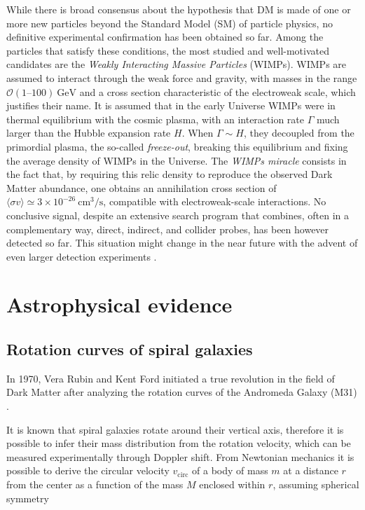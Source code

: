 While there is broad consensus about the hypothesis that DM is made of one or more new particles beyond the Standard Model (SM) of particle physics, 
no definitive experimental confirmation has been obtained so far. Among the particles that satisfy these conditions, the most studied and well-motivated candidates are the \emph{Weakly Interacting Massive Particles} (WIMPs). 
WIMPs are assumed to interact through the weak force and gravity, with masses in the range $\mathcal{O}(1\text{--}100)~\text{GeV}$ and a cross section characteristic of the electroweak scale, which justifies their name.
It is assumed that in the early Universe WIMPs were in thermal equilibrium with the cosmic plasma, with an interaction rate $\Gamma$ much larger than the Hubble expansion rate $H$. When $\Gamma \sim H$, they decoupled from the primordial plasma, the so-called \emph{freeze-out}, breaking this equilibrium and fixing the average density of WIMPs in the Universe.
The \emph{WIMPs miracle} consists in the fact that, by requiring this relic density to reproduce the observed Dark Matter abundance, one obtains an annihilation cross section of $\langle\sigma v\rangle \simeq 3\times10^{-26}~\text{cm}^3/\text{s}$, compatible with electroweak-scale interactions.
No conclusive signal, despite an extensive search program that combines, often in a complementary way, direct, indirect, and collider probes, has been however detected so far. This situation might change in the near
future with the advent of even larger detection experiments \cite{profumo, Arcadi_2025}.

\section{Astrophysical evidence}

\subsection{Rotation curves of spiral galaxies}

In 1970, Vera Rubin and Kent Ford initiated a true revolution in the field of Dark Matter after analyzing the rotation curves of 
the Andromeda Galaxy (M31) \cite{Ford}.

It is known that spiral galaxies rotate around their vertical axis, therefore it is possible to infer their mass distribution from the rotation velocity, which can be measured experimentally through Doppler shift.
From Newtonian mechanics it is possible to derive the circular velocity $v_{\mathrm{circ}}$ of a body of mass $m$ at a distance $r$ from the center as a function of the mass $M$ enclosed within $r$, assuming spherical symmetry


